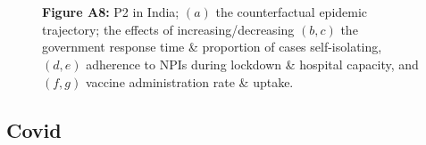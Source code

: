 \documentclass[paper=a4,fontsize=11pt]{article}
\begin{document}
\begin{figure}[!h]
  \\
  \hspace{1.76cm}
  \\
  \caption*{\textbf{Figure A8:} P2 in India; $(a)$ the counterfactual epidemic trajectory; the effects of increasing/decreasing $(b,c)$ the government response time \& proportion of cases self-isolating, $(d,e)$ adherence to NPIs during lockdown \& hospital capacity, and $(f,g)$ vaccine administration rate \& uptake.}
\end{figure}


\subsection{Covid}
\end{document}

